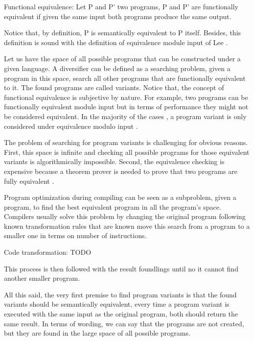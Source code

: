 
\begin{definition}{Functional equivalence:}
    \label{def:semantic_equivalence}
    Let P and P' two programs, P and P' are functionally equivalent if given the same input both programs produce the same output.
    
    Notice that, by definition, P is semantically equivalent to P itself. Besides, this definition is sound with the definition of equivalence module input of Lee \etal \cite{}.
\end{definition}

Let us have the space of all possible programs that can be constructed under a given language. A diversifier can be defined as a searching problem, \ie given a program in this space, search all other programs that are functionally equivalent to it. The found programs are called variants. Notice that, the concept of functional equivalence is subjective by nature. For example, two programs can be functionally equivalent module input but in terms of performance they might not be considered equivalent. In the majority of the cases \cite{}, a program variant is only considered under equivalence modulo input \cite{}.

The problem of searching for program variants is challenging for obvious reasons. First, this space is infinite and checking all possible programs for those equivalent variants is algorithmically impossible. Second, the equivalence checking is expensive because a theorem prover is needed to prove that two programs are fully equivalent \cite{}.

Program optimization during compiling can be seen as a subproblem, \ie given a program, to find the best equivalent program in all the program's space. Compilers usually solve this problem by changing the original program following known transformation rules that are known move this search from a program to a smaller one in terms on number of instructions. 


\begin{definition}{Code transformation:}
    \label{def:code_transformation}
    TODO
\end{definition}

This process is then followed with the result foundlings until no it cannot find another smaller program. 


All this said, the very first premise to find program variants is that the found variants should be semantically equivalent, \ie every time a program variant is executed with the same input as the original program, both should return the same result. In terms of wording, we can say that the programs are not created, but they are found in the large space of all possible programs. 


